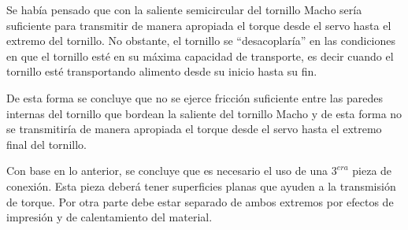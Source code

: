 Se había pensado que con la saliente semicircular del tornillo Macho sería suficiente para transmitir de manera apropiada el torque desde el servo hasta el extremo del tornillo. No obstante, el tornillo se ``desacoplaría'' en las condiciones en que el tornillo esté en su máxima capacidad de transporte, es decir cuando el tornillo esté transportando alimento desde su inicio hasta su fin. 

De esta forma se concluye que no se ejerce fricción suficiente entre las paredes internas del tornillo que bordean la saliente del tornillo Macho y de esta forma no se transmitiría de manera apropiada el torque desde el servo hasta el extremo final del tornillo.

Con base en lo anterior, se concluye que es necesario el uso de una $3^{era}$ pieza de conexión. Esta pieza deberá tener superficies planas que ayuden a la transmisión de torque. Por otra parte debe estar separado de ambos extremos por efectos de impresión y de calentamiento del material.\\


